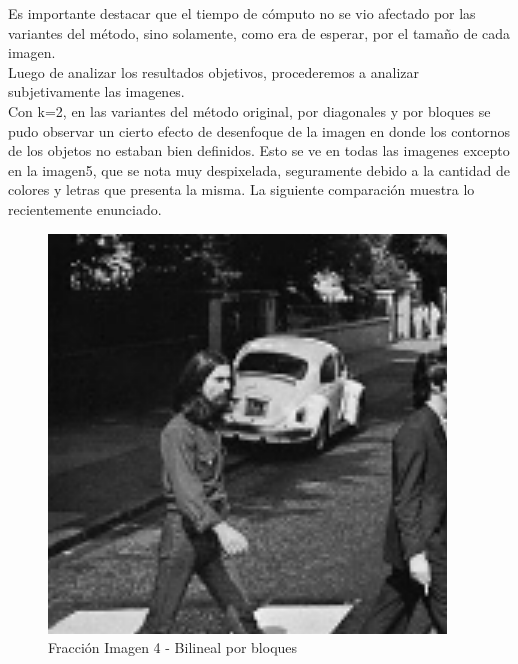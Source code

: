 \documentclass[a4paper]{article}
\newcounter{col}
\begin{document}
Es importante destacar que el tiempo de c\'omputo no se vio afectado por las variantes del m\'etodo, sino solamente, como era de esperar, por el tamaño de cada imagen.\\
Luego de analizar los resultados objetivos, procederemos a analizar subjetivamente las imagenes.\\
Con k=2, en las variantes del m\'etodo original, por diagonales y por bloques se pudo observar un cierto efecto de desenfoque de la imagen en donde los contornos de los objetos no estaban bien definidos. Esto se ve en todas las imagenes excepto en la imagen5, que se nota muy despixelada, seguramente debido a la cantidad de colores y letras que presenta la misma.
La siguiente comparaci\'on muestra lo recientemente enunciado.\\


    \begin{figure}[H]
    \centering
    \includegraphics[scale=0.5]{imagenes/imagen4informe.png}
    \caption{Fracci\'on Imagen 4 - Bilineal por bloques}
    \end{figure}
\end{document}
